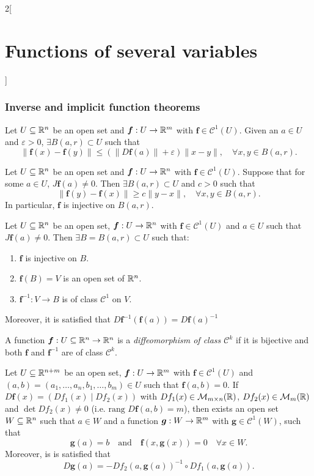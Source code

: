 \documentclass[../../../main.tex]{subfiles}
\begin{document}
\begin{multicols}{2}[\section{Functions of several variables}]
    \subsubsection*{Inverse and implicit function theorems}
    \begin{lemma}
        Let $U\subseteq\mathbb{R}^n$ be an open set and $\boldsymbol{f}:U\rightarrow\mathbb{R}^m$ with $\boldsymbol{f}\in \mathcal{C}^1(U)$. Given an $a\in U$ and $\varepsilon>0$, $\exists B(a,r)\subset U$ such that $$\|\boldsymbol{f}(x)-\boldsymbol{f}(y)\|\leq(\|D\boldsymbol{f}(a)\|+\varepsilon)\|x-y\|,\quad\forall x,y\in B(a,r).$$
    \end{lemma}
    \begin{lemma}
        Let $U\subseteq\mathbb{R}^n$ be an open set and $\boldsymbol{f}:U\rightarrow\mathbb{R}^n$ with $\boldsymbol{f}\in \mathcal{C}^1(U)$. Suppose that for some $a\in U$, $J\boldsymbol{f}(a)\ne 0$. Then $\exists B(a,r)\subset U$ and $c>0$ such that $$\|\boldsymbol{f}(y)-\boldsymbol{f}(x)\|\geq c\|y-x\|,\quad\forall x,y\in B(a,r).$$ In particular, $\boldsymbol{f}$ is injective on $B(a,r)$.
    \end{lemma}
    \begin{theorem}
        Let $U\subseteq\mathbb{R}^n$ be an open set, $\boldsymbol{f}:U\rightarrow\mathbb{R}^n$ with $\boldsymbol{f}\in \mathcal{C}^1(U)$ and $a\in U$ such that $J\boldsymbol{f}(a)\ne0$. Then $\exists B=B(a,r)\subset U$ such that:
        \begin{enumerate}
            \item $\boldsymbol{f}$ is injective on $B$.
            \item $\boldsymbol{f}(B)=V$ is an open set of $\mathbb{R}^n$.
            \item $\boldsymbol{f}^{-1}:V\rightarrow B$ is of class $\mathcal{C}^1$ on $V$.
        \end{enumerate} Moreover, it is satisfied that $D\boldsymbol{f}^{-1}(\boldsymbol{f}(a))=D\boldsymbol{f}(a)^{-1}$
    \end{theorem}
    \begin{definition}
        A function $\boldsymbol{f}:U\subseteq\mathbb{R}^n\rightarrow\mathbb{R}^n$ is a \textit{diffeomorphism of class $\mathcal{C}^k$} if it is bijective and both $\boldsymbol{f}$ and $\boldsymbol{f}^{-1}$ are of class $\mathcal{C}^k$.
    \end{definition}
    \begin{theorem}
        Let $U\subseteq\mathbb{R}^{n+m}$ be an open set, $\boldsymbol{f}:U\rightarrow\mathbb{R}^m$ with $\boldsymbol{f}\in \mathcal{C}^1(U)$ and $(a,b)=(a_1,\ldots,a_n,b_1,\ldots,b_m)\in U$ such that $\boldsymbol{f}(a,b)=0$. If $D\boldsymbol{f}(x)=(Df_1(x)\;|\;Df_2(x))$ with $Df_1(x)\in\mathcal{M}_{m\times n}(\mathbb{R} )$, $Df_2(x)\in\mathcal{M}_m(\mathbb{R} )$ and $\det Df_2(x)\ne 0$ (i.e. $\text{rang }D\boldsymbol{f}(a,b)=m$), then exists an open set $W\subseteq\mathbb{R}^n$ such that $a\in W$ and a function $\boldsymbol{g}:W\rightarrow\mathbb{R}^m$ with $\boldsymbol{g}\in\mathcal{C}^1(W)$, such that $$\boldsymbol{g}(a)=b\quad\text{and}\quad \boldsymbol{f}(x,\boldsymbol{g}(x))=0\quad\forall x\in W.$$ Moreover, is is satisfied that $$D\boldsymbol{g}(a)=-Df_2(a,\boldsymbol{g}(a))^{-1}\circ Df_1(a,\boldsymbol{g}(a)).$$

\end{theorem}
\end{multicols}
\end{document}
